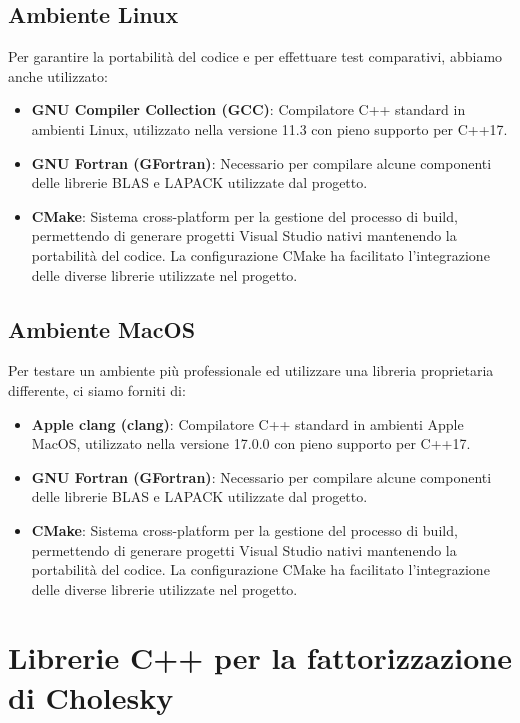 \subsection{Ambiente Linux}
Per garantire la portabilità del codice e per effettuare test comparativi, abbiamo anche utilizzato:

\begin{itemize}
    \item \textbf{GNU Compiler Collection (GCC)}: Compilatore C++ standard in ambienti Linux, utilizzato nella versione 11.3 con pieno supporto per C++17.
    
    \item \textbf{GNU Fortran (GFortran)}: Necessario per compilare alcune componenti delle librerie BLAS e LAPACK utilizzate dal progetto.
    
    \item \textbf{CMake}: Sistema cross-platform per la gestione del processo di build, permettendo di generare progetti Visual Studio nativi mantenendo la portabilità del codice. La configurazione CMake ha facilitato l'integrazione delle diverse librerie utilizzate nel progetto.
\end{itemize}

\subsection{Ambiente MacOS}
Per testare un ambiente più professionale ed utilizzare una libreria proprietaria differente, ci siamo forniti di:

\begin{itemize}
    \item \textbf{Apple clang (clang)}: Compilatore C++ standard in ambienti Apple MacOS, utilizzato nella versione 17.0.0 con pieno supporto per C++17.
    
    \item \textbf{GNU Fortran (GFortran)}: Necessario per compilare alcune componenti delle librerie BLAS e LAPACK utilizzate dal progetto.
    
    \item \textbf{CMake}: Sistema cross-platform per la gestione del processo di build, permettendo di generare progetti Visual Studio nativi mantenendo la portabilità del codice. La configurazione CMake ha facilitato l'integrazione delle diverse librerie utilizzate nel progetto.
\end{itemize}

\section{Librerie C++ per la fattorizzazione di Cholesky}

